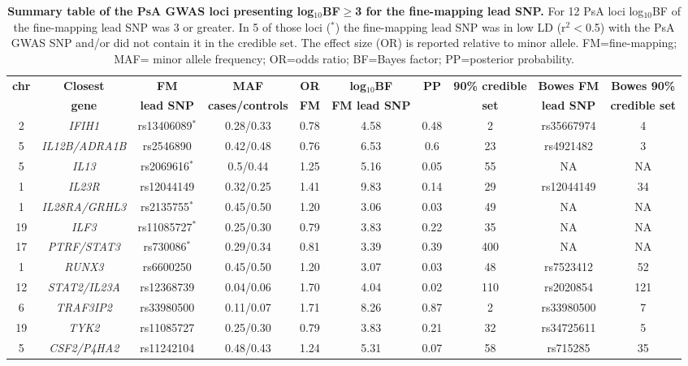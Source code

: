 \begin{landscape}
\begin{center}
\renewcommand{\arraystretch}{0.8}
\begin{longtable}[htbp]{c c c c c c c c c c}
\caption[Summary table of the PsA GWAS loci presenting log$_{10}$BF$\geq$3 for the fine-mapping lead SNP.]{\textbf{Summary table of the PsA GWAS loci presenting log$_{10}$BF$\geq$3 for the fine-mapping lead SNP.} For 12 PsA loci log${_10}$BF of the fine-mapping lead SNP was 3 or greater. In 5 of those loci ($^{\ast}$) the fine-mapping lead SNP was in low LD (r$^{2}<$0.5) with the PsA GWAS SNP and/or did not contain it in the credible set. The effect size (OR) is reported relative to minor allele. FM=fine-mapping; MAF= minor allele frequency; OR=odds ratio; BF=Bayes factor; PP=posterior probability.}
\label{tab:PsA_fine_mapping_summary} \\
\toprule
\textbf{chr} & \textbf{Closest} & \textbf{FM} & \textbf{MAF} & \textbf{OR} & \textbf{log$_{10}$BF} & \textbf{PP} & \textbf{90\% credible} &\textbf{Bowes FM} & \textbf{Bowes 90\%}\\
    & \textbf{gene} & \textbf{lead SNP} & \textbf{cases/controls} & \textbf{FM} & \textbf{FM lead SNP} &  & \textbf{set} &\textbf{lead SNP} & \textbf{credible set} \\
\midrule
\midrule
2	 &\textit{IFIH1}	       & rs13406089$^{\ast}$	&0.28/0.33	&0.78	&4.58	&0.48	&2	&rs35667974	&4 \\
5	 &\textit{IL12B/ADRA1B}  & rs2546890 	          &0.42/0.48	&0.76	&6.53	&0.6	&23	&rs4921482	&3 \\
5	 &\textit{IL13}	         &rs2069616$^{\ast}$	  &0.5/0.44	  &1.25	&5.16	&0.05	&55	&NA	 &NA \\
1	 &\textit{IL23R}	       &rs12044149	          &0.32/0.25	&1.41	&9.83	&0.14	&29	&rs12044149	&34 \\
1	 &\textit{IL28RA/GRHL3}  &rs2135755$^{\ast}$	  &0.45/0.50	&1.20	&3.06	&0.03	&49	&NA	&NA \\
19 &\textit{ILF3}	         &rs11085727$^{\ast}$	  &0.25/0.30	&0.79	&3.83	&0.22	&35	&NA	&NA \\
17 &\textit{PTRF/STAT3}    &rs730086$^{\ast}$     &0.29/0.34 &0.81 &3.39 &0.39 &400	&NA	&NA \\
1	 & \textit{RUNX3}	       & rs6600250	          &0.45/0.50	&1.20	&3.07	&0.03	&48	&rs7523412	&52 \\
12 &\textit{STAT2/IL23A}	 &rs12368739	          &0.04/0.06	&1.70	&4.04	&0.02	&110 &	rs2020854	&121 \\
6	 & \textit{TRAF3IP2}	   &rs33980500	          &0.11/0.07	&1.71	&8.26	&0.87	&2	&rs33980500	&7 \\
19 &	\textit{TYK2}	       &rs11085727	          &0.25/0.30	&0.79	&3.83	&0.21	&32	&rs34725611	&5 \\
5	 & \textit{CSF2/P4HA2}	 &rs11242104            &0.48/0.43 &1.24 &5.31 &0.07 &58	&rs715285 &35 \\
\bottomrule
\end{longtable}
\end{center}
\end{landscape}


